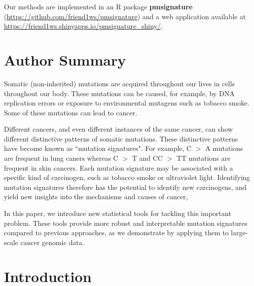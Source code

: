 \documentclass[10pt,letterpaper]{article}
\begin{document}
Our methods are implemented in an R package 
{\bf pmsignature} (\url{https://github.com/friend1ws/pmsignature})
and a web application available at \url{https://friend1ws.shinyapps.io/pmsignature_shiny/}.


\section*{Author Summary}

Somatic (non-inherited) mutations are acquired throughout our lives in cells throughout our body. These mutations
can be caused, for example, by DNA replication errors or exposure to environmental mutagens such as tobacco smoke. 
Some of these mutations can lead to cancer. 

Different cancers, and even different instances of the same
cancer, can show different distinctive patterns of somatic mutations. These distinctive patterns 
have become known as ``mutation signatures".
For example, C $>$ A mutations are frequent in lung caners
whereas C $>$ T and CC $>$ TT mutations are frequent in skin cancers. Each mutation signature may be associated with a specific kind of carcinogen, such as tobacco smoke or ultraviolet light. Identifying mutation signatures
therefore has the potential to identify new carcinogens, and
yield new insights into the mechanisms and causes of cancer, 

In this paper, we introduce new statistical tools
for tackling this important problem. These tools provide more robust and interpretable mutation signatures compared to previous approaches, as we demonstrate by applying them to large-scale cancer genomic data.

\linenumbers

\section*{Introduction}
\end{document}
